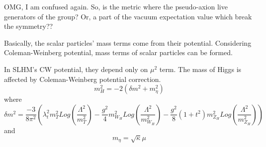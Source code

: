 \documentclass[aps,preprint,floatfix,nofootinbib,showpacs]{revtex4-1}
\begin{document}
OMG, I am confused again. So, is the metric where the pseudo-axion live 
generators of the group? 
Or, a part of the vacuum expectation value which break the symmetry??

\bigskip
\bigskip

Basically, the scalar particles' mass terms come from their potential. 
Considering Coleman-Weinberg potential, mass terms of scalar particles can be formed.

In SLHM's CW potential, they depend only on $\mu^2$ term. 
The mass of Higgs is affected by Coleman-Weinberg potential correction. 
\begin{equation}
 m^2_H = -2 (\delta m^2 + m^2_\eta)
\end{equation}
where 
\begin{equation}
 \delta m ^2 = \frac{-3}{8 \pi^2}(\lambda^2_t m^2_T Log(\frac{\Lambda^2}{m^2_T}) 
 - \frac{g^2}{4} m^2_{W_H} Log(\frac{\Lambda^2}{m^2_{W_H}}) - 
 \frac{g^2}{8}(1+t^2)m^2_{Z_H} Log(\frac{\Lambda^2}{m^2_{Z_H}}))
\end{equation}
and 
\begin{equation}
 m_\eta = \sqrt{\kappa}\mu
\end{equation}
\end{document}
